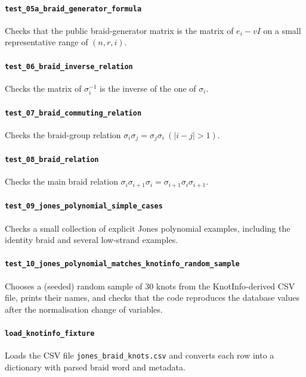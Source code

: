 ﻿\documentclass[10pt]{article}
\begin{document}
\paragraph{\texttt{test\_05a\_braid\_generator\_formula}}
Checks that the public braid-generator matrix is the matrix of \(e_i - vI\) on a
small representative range of \((n,r,i)\).

\paragraph{\texttt{test\_06\_braid\_inverse\_relation}}
Checks the matrix of \(\sigma_i^{-1}\) is the inverse of the one of \(\sigma_i\).

\paragraph{\texttt{test\_07\_braid\_commuting\_relation}}
Checks the braid-group relation $\sigma_i \sigma_j = \sigma_j \sigma_i\ (|i-j|>1)$.

\paragraph{\texttt{test\_08\_braid\_relation}}
Checks the main braid relation $\sigma_i \sigma_{i+1} \sigma_i=\sigma_{i+1} \sigma_i \sigma_{i+1}$.

\paragraph{\texttt{test\_09\_jones\_polynomial\_simple\_cases}}
Checks a small collection of explicit Jones polynomial examples, including the identity braid and several low-strand examples.

\paragraph{\texttt{test\_10\_jones\_polynomial\_matches\_knotinfo\_random\_sample}}
Chooses a (seeded) random sample of 30 knots from the KnotInfo-derived CSV file, prints their names, and checks that the code reproduces the database values after the normalisation change of variables.

\paragraph{\texttt{load\_knotinfo\_fixture}}
Loads the CSV file \texttt{jones\_braid\_knots.csv} and converts each row into a dictionary with parsed braid word and metadata.
\end{document}
